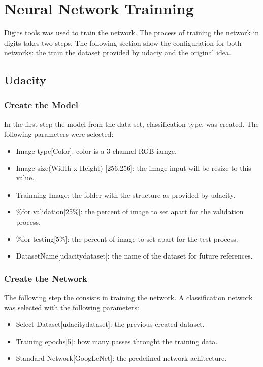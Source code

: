 \documentclass[10pt,journal,compsoc]{IEEEtran}
\begin{document}
\section{Neural Network Trainning}

Digits tools was used to train the network. The process of training the network in digits takes two steps. The following section show the configuration for both networks: the train the dataset provided by udaciy and the original idea.

\subsection{Udacity}
\subsubsection{Create the Model}

In the first step the model from the data set, classification type, was created. The following parameters were selected:

\begin{itemize}
\item Image type[Color]: color is a  3-channel RGB iamge.
\item Image size(Width x Height) [256,256]: the image input will be resize to this value. 
\item Trainning Image: the folder with the structure as provided by udacity.
\item \%for validation[25\%]: the percent of image to set apart for the validation process.
\item \%for testing[5\%]: the percent of image to set apart for the test process.
\item DatasetName[udacity\-dataset]: the name of the dataset for future references.
\end{itemize}

\subsubsection{Create the Network}

The following step the consists in training the network. A classification network was selected with the following parameters:

\begin{itemize}
\item Select Dataset[udacity\-dataset]: the previous created dataset.
\item Training epochs[5]: how many passes throught the training data.
\item Standard Network[GoogLeNet]: the predefined network achitecture.
\end{itemize}
\end{document}
